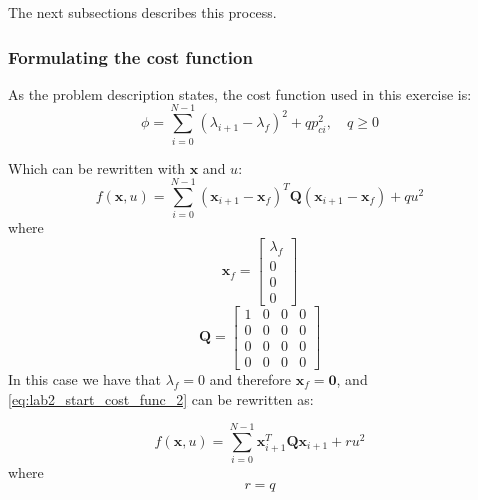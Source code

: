 \documentclass[../main.tex]{subfiles}
\begin{document}
The next subsections describes this process.

\subsubsection{Formulating the cost function} \label{sec:lab2_cost_func}
As the problem description states, the cost function used in this exercise is:
\begin{equation} \label{eq:lab2_start_cost_func}
	\phi = \sum_{i=0}^{N-1} \left( \lambda_{i+1} - \lambda_f \right)^2 + qp_{ci}^2 , \quad q \ge 0
\end{equation}

Which can be rewritten with $ \bm x $ and $ u $:
\begin{equation}\label{eq:lab2_start_cost_func_2}
	f(\bm x, u) = \sum_{i=0}^{N-1} \left( \bm x_{i+1} - \bm x_f \right)^T \bm Q \left( \bm x_{i+1} - \bm x_f \right) + q u^2
\end{equation}
where
\begin{equation}\label{eq:lab2_lambda_f}
	\bm x_f = \begin{bmatrix}
		\lambda_f \\ 0 \\ 0 \\ 0
	\end{bmatrix}
\end{equation}
\begin{equation}\label{eq:lab2_Q}
	\bm Q = \begin{bmatrix}
		1 & 0 & 0 & 0 \\
		0 & 0 & 0 & 0 \\
		0 & 0 & 0 & 0 \\
		0 & 0 & 0 & 0
	\end{bmatrix}
\end{equation}
In this case we have that $ \lambda_f = 0 $ and therefore $ \bm x_f = \bm 0 $, and \cref{eq:lab2_start_cost_func_2} can be rewritten as:

\begin{equation}\label{eq:lab2_LQR}
	f(\bm x, u) = \sum_{i=0}^{N-1} \bm x_{i+1}^T \bm Q \bm x_{i+1} + r u^2
\end{equation}
where
\begin{equation}\label{eq:lab2_R}
	r = q
\end{equation}
\end{document}
